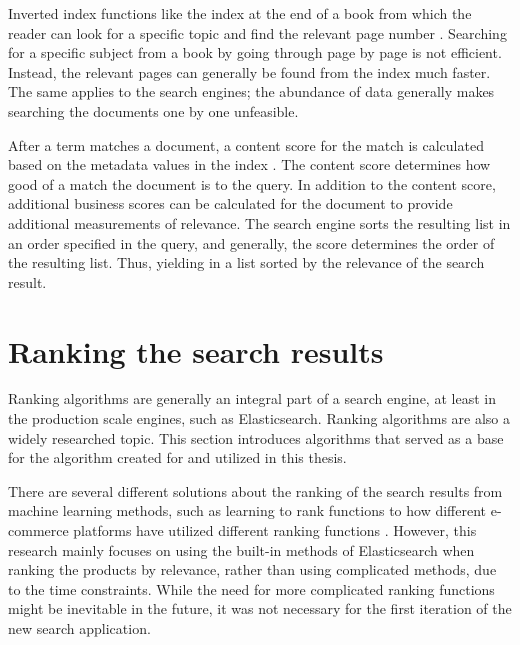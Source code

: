 Inverted index functions like the index at the end of a book 
from which the reader can look for a specific topic and find the relevant page number \cite{relevantSearch}.
Searching for a specific subject from a book by going through page by page is not efficient.
Instead, the relevant pages can generally be found from the index much faster.
The same applies to the search engines;
the abundance of data generally makes searching the documents one by one unfeasible.


After a term matches a document, a content score for the match is calculated based on the metadata values in the index
\cite{relevantSearch}.
The content score determines how good of a match the document is to the query.
In addition to the content score, additional business scores can be calculated for the document to provide 
additional measurements of relevance.
The search engine sorts the resulting list in an order specified in the query, and generally, 
the score determines the order of the resulting list. 
Thus, yielding in a list sorted by the relevance of the search result.







\section{Ranking the search results}
\label{sec:ranking}

Ranking algorithms are generally an integral part of a search engine, at least in
the production scale engines, such as Elasticsearch.
Ranking algorithms are also a widely researched topic.
This section introduces algorithms that served as a base for the 
algorithm created for and utilized in this thesis.

There are several different solutions
about the ranking of the search results from machine learning methods, such as learning to rank functions
\cite{l2rEntitiesWeb, learningRankEC} to how different e-commerce platforms have utilized different ranking
functions \cite{amazonJoyRanking, predictionRelevanceSearchResults, turningClickPurhases}.
However, this research mainly focuses on using the built-in methods of Elasticsearch
when ranking the products by relevance, rather than using complicated methods, due to the time constraints.
While the need for more complicated ranking functions might be inevitable in the future,
it was not necessary for the first iteration of the new search application.



